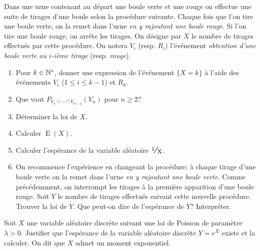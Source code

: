 \documentclass[a4paper,12pt,reqno]{amsart}
\DeclareMathOperator{\E}{E}
\begin{document}
\begin{exo}

  Dans une urne contenant au départ une boule verte et une rouge on effectue une suite de tirages d'une boule selon la procédure suivante. Chaque fois que l'on tire une boule verte, on la remet dans l'urne \emph{en y rajoutant une boule rouge}. Si l'on tire une boule rouge, on arrête les tirages. On désigne par $X$ le nombre de tirages effectués par cette procédure. On notera $V_i$ (resp. $R_i$) l'événement \emph{obtention d'une boule verte au $i$-ième tirage} (resp. \emph{rouge}).

  \begin{enumerate}
    \item Pour $k\in\mathbb{N}^{\ast}$, donner une expression de l'événement $\{X=k\}$ à l'aide des événements $V_i$ ($1\leq i\leq k-1$) et $R_k$.
    \item Que vaut $P_{V_1\cap\cdots\cap V_{n-1}}(V_n)$ pour $n\geq 2$?
    \item Déterminer la loi de $X$.
    \item Calculer $\E(X)$.
    \item Calculer l'espérance de la variable aléatoire $\dsfrac{1}{X}$.
    \item On recommence l'expérience en changeant la procédure: à chaque tirage d'une boule verte on la remet dans l'urne \emph{en y rajoutant une boule verte}. Comme précédemment, on interrompt les tirages à la première apparition d'une boule rouge. Soit $Y$ le nombre de tirages effectués suivant cette nouvelle procédure. Trouver la loi de $Y$. Que peut-on dire de l'espérance de $Y$? Interpréter.
  \end{enumerate}

\end{exo}

\begin{exo}

  Soit $X$ une variable aléatoire discrète suivant une loi de Poisson de paramètre $\lambda>0$. Justifier que l'espérance de la variable aléatoire discrète $Y=e^X$ existe  et la calculer. On dit que $X$ admet un moment exponentiel.

\end{exo}
\end{document}
